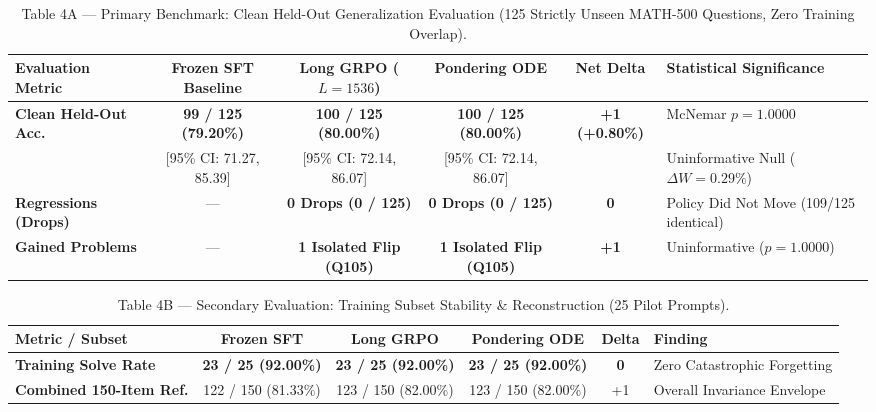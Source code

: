 \documentclass[11pt,a4paper]{article}
\begin{document}
\begin{table}[htbp]
\centering
\caption{Table 4A --- Primary Benchmark: Clean Held-Out Generalization Evaluation (125 Strictly Unseen MATH-500 Questions, Zero Training Overlap).}
\label{tab:grpo_clean}
\small
\begin{tabular}{@{}lccccl@{}}
\toprule
\textbf{Evaluation Metric} & \textbf{Frozen SFT Baseline} & \textbf{Long GRPO ($L=1536$)} & \textbf{Pondering ODE} & \textbf{Net Delta} & \textbf{Statistical Significance} \\
\midrule
\textbf{Clean Held-Out Acc.} & \textbf{99 / 125 (79.20\%)} & \textbf{100 / 125 (80.00\%)} & \textbf{100 / 125 (80.00\%)} & \textbf{+1 (+0.80\%)} & McNemar $p = 1.0000$ \\
 & {\scriptsize [95\% CI: 71.27, 85.39]} & {\scriptsize [95\% CI: 72.14, 86.07]} & {\scriptsize [95\% CI: 72.14, 86.07]} & & Uninformative Null ($\Delta W=0.29\%$) \\
\addlinespace
\textbf{Regressions (Drops)} & --- & \textbf{0 Drops (0 / 125)} & \textbf{0 Drops (0 / 125)} & \textbf{0} & Policy Did Not Move (109/125 identical) \\
\textbf{Gained Problems} & --- & \textbf{1 Isolated Flip (Q105)} & \textbf{1 Isolated Flip (Q105)} & \textbf{+1} & Uninformative ($p=1.0000$) \\
\bottomrule
\end{tabular}
\end{table}

\begin{table}[htbp]
\centering
\caption{Table 4B --- Secondary Evaluation: Training Subset Stability \& Reconstruction (25 Pilot Prompts).}
\label{tab:grpo_train}
\small
\begin{tabular}{@{}lccccl@{}}
\toprule
\textbf{Metric / Subset} & \textbf{Frozen SFT} & \textbf{Long GRPO} & \textbf{Pondering ODE} & \textbf{Delta} & \textbf{Finding} \\
\midrule
\textbf{Training Solve Rate} & \textbf{23 / 25 (92.00\%)} & \textbf{23 / 25 (92.00\%)} & \textbf{23 / 25 (92.00\%)} & \textbf{0} & Zero Catastrophic Forgetting \\
\textbf{Combined 150-Item Ref.} & 122 / 150 (81.33\%) & 123 / 150 (82.00\%) & 123 / 150 (82.00\%) & +1 & Overall Invariance Envelope \\
\bottomrule
\end{tabular}
\end{table}
\end{document}
